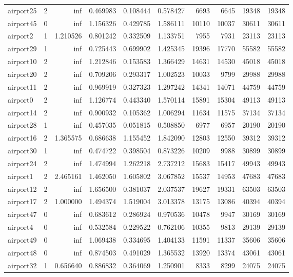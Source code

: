 \begin{longtable}{|l|r|r|r|r|r|r|r|r|r|}
airport25 & 2 & inf & 0.469983 & 0.108444 & 0.578427 & 6693 & 6645 & 19348 & 19348 \\
airport45 & 0 & inf & 1.156326 & 0.429785 & 1.586111 & 10110 & 10037 & 30611 & 30611 \\
airport2 & 1 & 1.210526 & 0.801242 & 0.332509 & 1.133751 & 7955 & 7931 & 23113 & 23113 \\
airport29 & 1 & inf & 0.725443 & 0.699902 & 1.425345 & 19396 & 17770 & 55582 & 55582 \\
airport10 & 2 & inf & 1.212846 & 0.153583 & 1.366429 & 14631 & 14530 & 45018 & 45018 \\
airport20 & 2 & inf & 0.709206 & 0.293317 & 1.002523 & 10033 & 9799 & 29988 & 29988 \\
airport11 & 2 & inf & 0.969919 & 0.327323 & 1.297242 & 14341 & 14071 & 44759 & 44759 \\
airport0 & 2 & inf & 1.126774 & 0.443340 & 1.570114 & 15891 & 15304 & 49113 & 49113 \\
airport14 & 2 & inf & 0.900932 & 0.105362 & 1.006294 & 11634 & 11575 & 37134 & 37134 \\
airport28 & 1 & inf & 0.457035 & 0.051815 & 0.508850 & 6977 & 6957 & 20190 & 20190 \\
airport16 & 2 & 1.365575 & 0.686638 & 1.155452 & 1.842090 & 12803 & 12550 & 39312 & 39312 \\
airport30 & 1 & inf & 0.474722 & 0.398504 & 0.873226 & 10209 & 9988 & 30899 & 30899 \\
airport24 & 2 & inf & 1.474994 & 1.262218 & 2.737212 & 15683 & 15417 & 49943 & 49943 \\
airport1 & 2 & 2.465161 & 1.462050 & 1.605802 & 3.067852 & 15537 & 14953 & 47683 & 47683 \\
airport12 & 2 & inf & 1.656500 & 0.381037 & 2.037537 & 19627 & 19331 & 63503 & 63503 \\
airport17 & 2 & 1.000000 & 1.494374 & 1.519004 & 3.013378 & 13175 & 13086 & 40394 & 40394 \\
airport47 & 0 & inf & 0.683612 & 0.286924 & 0.970536 & 10478 & 9947 & 30169 & 30169 \\
airport4 & 0 & inf & 0.532584 & 0.229522 & 0.762106 & 10355 & 9813 & 29139 & 29139 \\
airport49 & 0 & inf & 1.069438 & 0.334695 & 1.404133 & 11591 & 11337 & 35606 & 35606 \\
airport48 & 0 & inf & 0.874503 & 0.491029 & 1.365532 & 13920 & 13374 & 43061 & 43061 \\
airport32 & 1 & 0.656640 & 0.886832 & 0.364069 & 1.250901 & 8333 & 8299 & 24075 & 24075 \\

\end{longtable}
